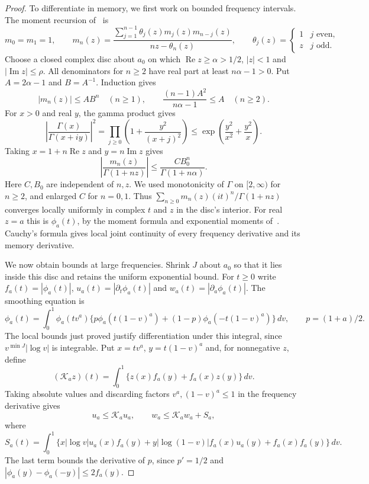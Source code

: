 \begin{proof}
To differentiate in memory, we first work on bounded frequency intervals.
The moment recursion of~\cite[Theorem~1.4]{glr2026} is
\[
 m_0=m_1=1,\qquad
 m_n(z)=\frac{\sum_{j=1}^{n-1}\theta_j(z)m_j(z)m_{n-j}(z)}
                   {nz-\theta_n(z)},\qquad
 \theta_j(z)=\begin{cases}1&j\text{ even},\\z&j\text{ odd}.
                  \end{cases}
\]
Choose a closed complex disc about $a_0$ on which
$\operatorname{Re}z\ge\alpha>1/2$, $|z|<1$ and
$|\operatorname{Im}z|\le\rho$. All denominators for $n\ge2$ have
real part at least $n\alpha-1>0$.
Put $A=2\alpha-1$ and $B=A^{-1}$. Induction gives
\[
 |m_n(z)|\le AB^n\quad(n\ge1),\qquad
 \frac{(n-1)A^2}{n\alpha-1}\le A\quad(n\ge2).
\]
For $x>0$ and real $y$, the gamma product gives
\[
 \left|\frac{\Gamma(x)}{\Gamma(x+iy)}\right|^2
 =\prod_{j\ge0}\left(1+\frac{y^2}{(x+j)^2}\right)
 \le\exp\left(\frac{y^2}{x^2}+\frac{y^2}{x}\right).
\]
Taking $x=1+n\operatorname{Re}z$ and $y=n\operatorname{Im}z$ gives
\[
 \left|\frac{m_n(z)}{\Gamma(1+nz)}\right|
 \le\frac{C B_0^n}{\Gamma(1+n\alpha)}.
\]
Here $C,B_0$ are independent of $n,z$. We used monotonicity of
$\Gamma$ on $[2,\infty)$ for $n\ge2$, and enlarged $C$ for $n=0,1$.
Thus $\sum_{n\ge0}m_n(z)(it)^n/\Gamma(1+nz)$ converges locally
uniformly in complex $t$ and $z$ in the disc's interior.
For real $z=a$ this is $\phi_a(t)$, by the moment formula and
exponential moments of~\cite[Corollary~2.11]{glr2026}.
Cauchy's formula gives local joint continuity of every frequency
derivative and its memory derivative.

We now obtain bounds at large frequencies.
Shrink $J$ about $a_0$ so that it lies inside this disc and retains the
uniform exponential bound. For $t\ge0$ write
$f_a(t)=|\phi_a(t)|$, $u_a(t)=|\partial_t\phi_a(t)|$ and
$w_a(t)=|\partial_a\phi_a(t)|$. The smoothing equation is
\[
 \phi_a(t)=\int_0^1\phi_a(tv^a)
 \{p\phi_a(t(1-v)^a)+(1-p)\phi_a(-t(1-v)^a)\}\,dv,
 \qquad p=(1+a)/2.
\]
The local bounds just proved justify differentiation under this integral,
since $v^{\min J}|\log v|$ is integrable. Put $x=tv^a$,
$y=t(1-v)^a$ and, for nonnegative $z$, define
\[
 (\mathcal K_a z)(t)=\int_0^1\{z(x)f_a(y)+f_a(x)z(y)\}\,dv.
\]
Taking absolute values and discarding factors $v^a,(1-v)^a\le1$
in the frequency derivative gives
\[
 u_a\le\mathcal K_a u_a,\qquad
 w_a\le\mathcal K_a w_a+S_a,
\]
where
\[
 S_a(t)=\int_0^1\{x|\log v|u_a(x)f_a(y)
       +y|\log(1-v)|f_a(x)u_a(y)+f_a(x)f_a(y)\}\,dv.
\]
The last term bounds the derivative of $p$, since $p'=1/2$ and
$|\phi_a(y)-\phi_a(-y)|\le2f_a(y)$.


\end{proof}
